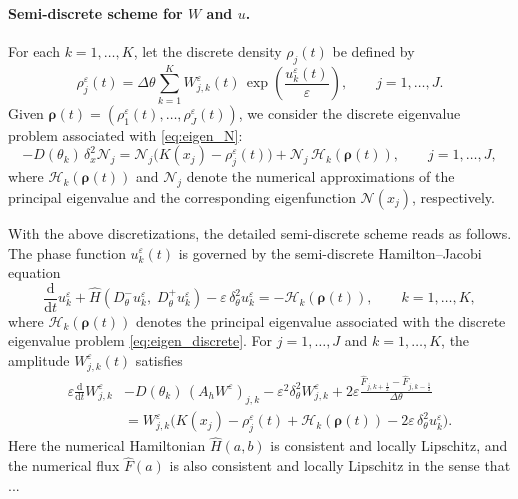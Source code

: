 \documentclass[11pt, dina4, amsfont12]{article}
\begin{document}
\paragraph{Semi-discrete scheme for $W$ and $u$.}
For each $k=1,\dots,K$, let the discrete density $\rho_j(t)$ be defined by
\begin{equation} \label{eq:rho}
    \rho_j^\varepsilon(t)
=
\Delta\theta \sum_{k=1}^K
W_{j,k}^\varepsilon(t)\,
\exp\!\left(\frac{u_k^\varepsilon(t)}{\varepsilon}\right),
\qquad j=1,\dots,J.
\end{equation}
Given $\boldsymbol{\rho}(t) = (\rho_1^\varepsilon(t), \dots, \rho_J^\varepsilon(t))$, we consider the discrete eigenvalue problem associated
with \eqref{eq:eigen_N}:
\begin{equation}\label{eq:eigen_discrete}
    -D(\theta_k)\,\delta_x^2 \mathcal{N}_j
    = \mathcal{N}_j\bigl(K(x_j)-\rho_j^\varepsilon(t)\bigr)
    + \mathcal{N}_j\, \mathcal{H}_k(\boldsymbol{\rho}(t)),
    \qquad j = 1,\dots, J,
\end{equation}
where $\mathcal{H}_k(\boldsymbol{\rho}(t))$ and $\mathcal{N}_j$ denote the numerical
approximations of the principal eigenvalue and the corresponding eigenfunction
$\mathcal{N}(x_j)$, respectively.

With the above discretizations, the detailed semi-discrete scheme reads as
follows. The phase function $u_k^\varepsilon(t)$ is governed by the semi-discrete
Hamilton--Jacobi equation
\begin{equation}\label{eq:semi_discrete_u_detailed}
\frac{\mathrm d}{\mathrm dt} u_k^\varepsilon
+
\widehat{H}
\!\left(D_\theta^- u_k^\varepsilon,\; D_\theta^+ u_k^\varepsilon\right)
- \varepsilon\, \delta_\theta^2 u_k^\varepsilon
= - \mathcal{H}_k(\boldsymbol{\rho}(t)),
\qquad k=1,\dots,K,
\end{equation}
where $\mathcal{H}_k(\boldsymbol{\rho}(t))$ denotes the principal eigenvalue associated
with the discrete eigenvalue problem \eqref{eq:eigen_discrete}.
For $j=1,\dots,J$ and $k=1,\dots,K$, the amplitude $W_{j,k}^\varepsilon(t)$
satisfies
\begin{equation}\label{eq:semi_discrete_W_detailed}
\begin{aligned}
\varepsilon \frac{\mathrm d}{\mathrm dt} W_{j,k}^\varepsilon
&- D(\theta_k)\,(A_h W^\varepsilon)_{j,k}
- \varepsilon^2 \delta_\theta^2 W^\varepsilon_{j,k}
+ 2 \varepsilon \frac{\widehat F_{j,k+\frac12}-\widehat F_{j,k-\frac12}}{\Delta\theta} \\
&= W_{j,k}^\varepsilon
\bigl(K(x_j)-\rho_j^\varepsilon(t)
+ \mathcal{H}_k(\boldsymbol{\rho}(t))
-2\varepsilon\,\delta_\theta^2 u_k^\varepsilon\bigr).
\end{aligned}
\end{equation}
Here the numerical Hamiltonian $\widehat{H}(a,b)$ is consistent and locally Lipschitz, 
and the numerical flux $\widehat F(a)$ is also consistent and locally Lipschitz in the sense that ...
\end{document}
